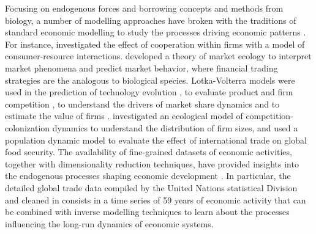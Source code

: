   Focusing on endogenous forces and borrowing concepts and methods from biology, a number of modelling approaches have broken with the traditions of standard economic modelling \citep{10.1093/cje/bet027} to study the processes driving economic patterns \citep{Tacchella2018}.
  For instance, \cite{Saavedra2009a} investigated the effect of cooperation within firms with a model of consumer-resource interactions. \cite{Scholl2020} developed a theory of market ecology to interpret market phenomena and predict market behavior, where financial trading strategies are the analogous to biological species.
  Lotka-Volterra models were used in the prediction of technology evolution \citep{Zhang2018}, to evaluate product and firm competition \citep{Modis1997,Saavedra2014}, to understand the drivers of market share dynamics \citep{Farmer1999,Michalakelis2011,Marasco2016,Gatabazi2019} and to estimate the value of firms \citep{Cauwels56}.
  \cite{Applegate2021} investigated an ecological model of competition-colonization dynamics to understand the distribution of firm sizes, and \cite{Suweis2015} used a population dynamic model to evaluate the effect of international trade on global food security.
  The availability of fine-grained datasets of economic activities, together with dimensionality reduction techniques, have provided insights into the endogenous processes shaping economic development \citep{Mealy2019,Hidalgo2021}.
  In particular, the detailed global trade data compiled by the United Nations statistical Division and cleaned in \cite{Hidalgo2021} consists in a time series of 59 years of economic activity that can be combined with inverse modelling techniques to learn about the processes influencing the long-run dynamics of economic systems.
  
